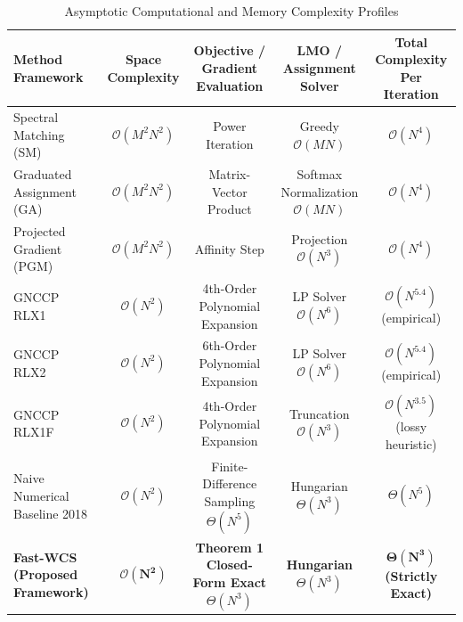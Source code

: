 \documentclass[conference]{IEEEtran}
\begin{document}
\begin{table}[t]
\centering
\caption{Asymptotic Computational and Memory Complexity Profiles}
\label{tab:complexity_comparison}
\fontsize{7.2}{8.6}\selectfont
\setlength{\tabcolsep}{3.0pt}
\begin{tabular*}{\textwidth}{@{\extracolsep{\fill}}lcccc@{}}
\toprule
\textbf{Method Framework} & \textbf{Space Complexity} & \textbf{Objective / Gradient Evaluation} & \textbf{LMO / Assignment Solver} & \textbf{Total Complexity Per Iteration} \\
\midrule
Spectral Matching (SM) \cite{leordeanu2005} & $\mathcal{O}(M^2 N^2)$ & Power Iteration & Greedy $\mathcal{O}(MN)$ & $\mathcal{O}(N^4)$ \\
Graduated Assignment (GA) \cite{gold1996} & $\mathcal{O}(M^2 N^2)$ & Matrix-Vector Product & Softmax Normalization $\mathcal{O}(MN)$ & $\mathcal{O}(N^4)$ \\
Projected Gradient (PGM) \cite{zaslavskiy2009} & $\mathcal{O}(M^2 N^2)$ & Affinity Step & Projection $\mathcal{O}(N^3)$ & $\mathcal{O}(N^4)$ \\
\midrule
GNCCP RLX1 \cite{yang2018algorithm} & $\mathcal{O}(N^2)$ & 4th-Order Polynomial Expansion & LP Solver $\mathcal{O}(N^6)$ & $\mathcal{O}(N^{5.4})$ (empirical) \\
GNCCP RLX2 \cite{yang2018algorithm} & $\mathcal{O}(N^2)$ & 6th-Order Polynomial Expansion & LP Solver $\mathcal{O}(N^6)$ & $\mathcal{O}(N^{5.4})$ (empirical) \\
GNCCP RLX1F \cite{yang2018algorithm} & $\mathcal{O}(N^2)$ & 4th-Order Polynomial Expansion & Truncation $\mathcal{O}(N^3)$ & $\mathcal{O}(N^{3.5})$ (lossy heuristic) \\
Naive Numerical Baseline 2018 & $\mathcal{O}(N^2)$ & Finite-Difference Sampling $\Theta(N^5)$ & Hungarian $\Theta(N^3)$ & $\Theta(N^5)$ \\
\midrule
\textbf{Fast-WCS (Proposed Framework)} & $\mathbf{\mathcal{O}(N^2)}$ & \textbf{Theorem 1 Closed-Form Exact $\Theta(N^3)$} & \textbf{Hungarian $\Theta(N^3)$} & $\mathbf{\Theta(N^3)}$ \textbf{(Strictly Exact)} \\
\bottomrule
\end{tabular*}
\end{table}

\end{document}
